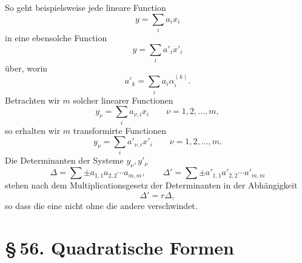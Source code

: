\documentclass[11pt]{article}
\newcommand{\sect}[2]{\section*{\S\,#1. #2}}
\begin{document}
So geht beispielsweise jede lineare Function
\[
 y=\sum_i a_i x_i
\]
in eine ebensolche Function
\[
 y=\sum_i a'_i x'_i
\]
über, worin
\begin{equation}
 a'_k=\sum_i a_i\alpha_i^{(k)}.
\tag{3}
\end{equation}
Betrachten wir $m$ solcher linearer Functionen
\[
 y_\nu=\sum_i a_{\nu,i}x_i\qquad \nu=1,2,\ldots,m,
\]
so erhalten wir $m$ transformirte Functionen
\[
 y_\nu=\sum_i a'_{\nu,i}x'_i\qquad \nu=1,2,\ldots,m.
\]
Die Determinanten der Systeme $y_\nu,y'_\nu$
\[
 \Delta=\sum \pm a_{1,1}a_{2,2}\cdots a_{m,m},
 \qquad
 \Delta'=\sum \pm a'_{1,1}a'_{2,2}\cdots a'_{m,m}
\]
stehen nach dem Multiplicationsgesetz der Determinanten in der Abhängigkeit
\begin{equation}
 \Delta'=r\Delta,
\tag{4}
\end{equation}
so dass die eine nicht ohne die andere verschwindet.

\sect{56}{Quadratische Formen}
\end{document}
